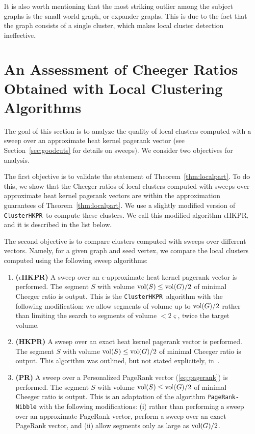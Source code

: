 \documentclass[runningheads,a4paper]{llncs}
\newcommand{\vol}{\textmd{vol}}
\newcommand{\partitionalg}{\texttt{ClusterHKPR}}
\begin{document}
It is also worth mentioning that the most striking outlier among the subject
graphs is the small world graph, or expander graphs.  This is due to the fact
that the graph consists of a single cluster, which makes local cluster detection
ineffective.

\section{An Assessment of Cheeger Ratios Obtained with Local Clustering Algorithms}
\label{sec:expresults}
The goal of this section is to analyze the quality of local clusters computed
with a sweep over an approximate heat kernel pagerank vector (see
Section~\ref{sec:goodcuts} for details on sweeps).  We consider two objectives
for analysis.

The first objective is to validate the statement of Theorem~\ref{thm:localpart}.
To do this, we show that the Cheeger ratios of local clusters computed with
sweeps over approximate heat kernel pagerank vectors are within the
approximation guarantees of Theorem~\ref{thm:localpart}.  We use a slightly
modified version of \partitionalg~to compute these clusters.  We call this
modified algorithm $\epsilon$HKPR, and it is described in the list below.  

The second objective is to compare clusters computed with sweeps over different
vectors.  Namely, for a given graph and seed vertex, we compare the local
clusters computed using the following sweep algorithms:

\begin{enumerate}
\item \textbf{($\epsilon$HKPR)} A sweep over an $\epsilon$-approximate heat
kernel pagerank vector is performed.  The segment $S$ with volume $\vol(S) \leq
\vol(G)/2$ of minimal Cheeger ratio is output.  This is the
\partitionalg~algorithm with the following modification: we allow segments of
volume up to $\vol(G)/2$ rather than limiting the search to segments of volume
$< 2\varsigma$, twice the target volume.\label{pt:epshkpr}
\item \textbf{(HKPR)} A sweep over an exact heat kernel pagerank vector is
performed.  The segment $S$ with volume $\vol(S) \leq \vol(G)/2$ of minimal Cheeger
ratio is output.  This algorithm was outlined, but not stated explicitely,
in~\cite{chung:partitionhkpr:im09}.
\item \textbf{(PR)} A sweep over a Personalized PageRank vector
(\ref{eq:pagerank}) is performed.  The segment $S$ with volume $\vol(S) \leq
\vol(G)/2$ of minimal Cheeger ratio is output.  This is an adaptation of the
algorithm \texttt{PageRank-Nibble}\cite{acl:prgraphpartition:focs06} with the
following modifications: (i) rather than performing a sweep over an approximate
PageRank vector, perform a sweep over an exact PageRank vector, and (ii) allow
segments only as large as $\vol(G)/2$.
\end{enumerate}
\end{document}
